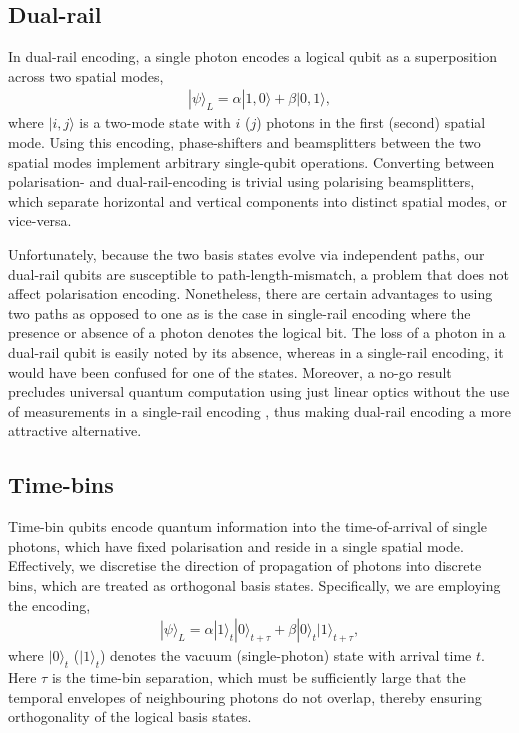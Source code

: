 \documentclass[times,final]{elsarticle}
\newcommand{\ket}[1]{|#1\rangle}
\begin{document}
\subsection{Dual-rail}

In dual-rail encoding, a single photon encodes a logical qubit as a superposition across two spatial modes,
\begin{align}
\ket\psi_L = \alpha\ket{1,0} + \beta\ket{0,1},
\end{align}
where $\ket{i,j}$ is a two-mode state with $i$ ($j$) photons in the first (second) spatial mode. Using this encoding, phase-shifters and beamsplitters between the two spatial modes implement arbitrary single-qubit operations. Converting between polarisation- and dual-rail-encoding is trivial using polarising beamsplitters, which separate horizontal and vertical components into distinct spatial modes, or vice-versa.

Unfortunately, because the two basis states evolve via independent paths, our dual-rail qubits are susceptible to path-length-mismatch, a problem that does not affect polarisation encoding. Nonetheless, there are certain advantages to using two paths as opposed to one as is the case in single-rail encoding where the presence or absence of a photon denotes the logical bit. The loss of a photon in a dual-rail qubit is easily noted by its absence, whereas in a single-rail encoding, it would have been confused for one of the states. Moreover, a no-go result precludes universal quantum computation using just linear optics without the use of measurements in a single-rail encoding \cite{bib:Wu13}, thus making dual-rail encoding a more attractive alternative.


\subsection{Time-bins}

Time-bin qubits encode quantum information into the time-of-arrival of single photons, which have fixed polarisation and reside in a single spatial mode. Effectively, we discretise the direction of propagation of photons into discrete bins, which are treated as orthogonal basis states. Specifically, we are employing the encoding,
\begin{align}
\ket\psi_L = \alpha\ket{1}_{t}\ket{0}_{t+\tau} + \beta \ket{0}_{t}\ket{1}_{t+\tau},
\end{align}
where $\ket{0}_t$ ($\ket{1}_t$) denotes the vacuum (single-photon) state with arrival time $t$. Here $\tau$ is the time-bin separation, which must be sufficiently large that the temporal envelopes of neighbouring photons do not overlap, thereby ensuring orthogonality of the logical basis states.
\end{document}
